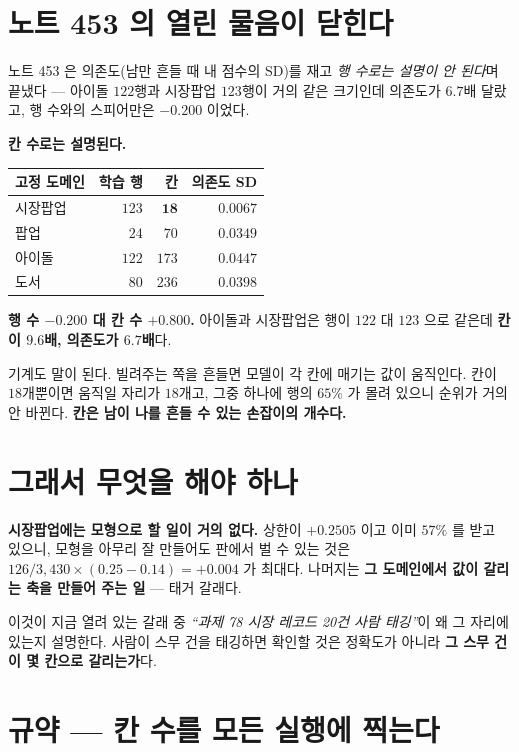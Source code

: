 \documentclass[11pt]{article}
\begin{document}
\section{노트 453 의 열린 물음이 닫힌다}

노트 453 은 의존도(남만 흔들 때 내 점수의 SD)를 재고 \emph{행 수로는
설명이 안 된다}며 끝냈다 --- 아이돌 $122$행과 시장팝업 $123$행이 거의
같은 크기인데 의존도가 $6.7$배 달랐고, 행 수와의 스피어만은 $-0.200$
이었다.

\textbf{칸 수로는 설명된다.}

\begin{center}
\begin{tabular}{lrrr}
\hline
고정 도메인 & 학습 행 & 칸 & 의존도 SD \\
\hline
시장팝업 & $123$ & $\mathbf{18}$ & $0.0067$ \\
팝업 & $24$ & $70$ & $0.0349$ \\
아이돌 & $122$ & $173$ & $0.0447$ \\
도서 & $80$ & $236$ & $0.0398$ \\
\hline
\end{tabular}
\end{center}

\textbf{행 수 $-0.200$ 대 칸 수 $+0.800$.} 아이돌과 시장팝업은 행이
$122$ 대 $123$ 으로 같은데 \textbf{칸이 $9.6$배, 의존도가 $6.7$배}다.

기계도 말이 된다. 빌려주는 쪽을 흔들면 모델이 각 칸에 매기는 값이
움직인다. 칸이 $18$개뿐이면 움직일 자리가 $18$개고, 그중 하나에 행의
$65\%$ 가 몰려 있으니 순위가 거의 안 바뀐다. \textbf{칸은 남이 나를
흔들 수 있는 손잡이의 개수다.}

\section{그래서 무엇을 해야 하나}

\textbf{시장팝업에는 모형으로 할 일이 거의 없다.} 상한이 $+0.2505$ 이고
이미 $57\%$ 를 받고 있으니, 모형을 아무리 잘 만들어도 판에서 벌 수 있는
것은 $126/3{,}430 \times (0.25 - 0.14) = +0.004$ 가 최대다. 나머지는
\textbf{그 도메인에서 값이 갈리는 축을 만들어 주는 일} --- 태거 갈래다.

이것이 지금 열려 있는 갈래 중 \emph{``과제 78 시장 레코드 20건 사람
태깅''}이 왜 그 자리에 있는지 설명한다. 사람이 스무 건을 태깅하면
확인할 것은 정확도가 아니라 \textbf{그 스무 건이 몇 칸으로 갈리는가}다.

\section*{규약 --- 칸 수를 모든 실행에 찍는다}
\end{document}
